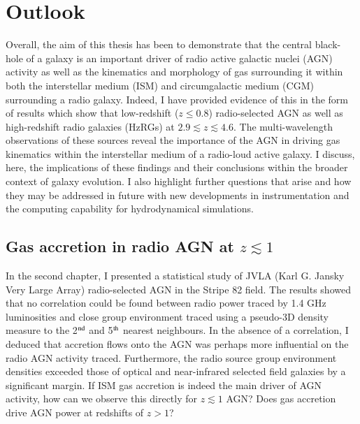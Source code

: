 \chapter[Outlook]{Outlook}

Overall, the aim of this thesis has been to demonstrate that the central black-hole of a galaxy is an important driver of radio active galactic nuclei (AGN) activity as well as the kinematics and morphology of gas surrounding it within both the interstellar medium (ISM) and circumgalactic medium (CGM) surrounding a radio galaxy. Indeed, I have provided evidence of this in the form of results which show that low-redshift ($z \leq 0.8$) radio-selected AGN as well as high-redshift radio galaxies (HzRGs) at $2.9 \lesssim z \lesssim 4.6.$ The multi-wavelength observations of these sources reveal the importance of the AGN in driving gas kinematics within the interstellar medium of a radio-loud active galaxy. I discuss, here, the implications of these findings and their conclusions within the broader context of galaxy evolution. I also highlight further questions that arise and how they may be addressed in future with new developments in instrumentation and the computing capability for hydrodynamical simulations. \\

\section{Gas accretion in radio AGN at $z \lesssim 1$}

In the second chapter, I presented a statistical study of JVLA (Karl G. Jansky Very Large Array) radio-selected AGN in the Stripe 82 field. The results showed that no correlation could be found between radio power traced by 1.4 GHz luminosities and close group environment traced using a pseudo-3D density measure to the 2$^{\rm nd}$ and 5$^{\rm th}$ nearest neighbours. In the absence of a correlation, I deduced that accretion flows onto the AGN was perhaps more influential on the radio AGN activity traced. Furthermore, the radio source group environment densities exceeded those of optical and near-infrared selected field galaxies by a significant margin. If ISM gas accretion is indeed the main driver of AGN activity, how can we observe this directly for $z \lesssim 1$ AGN? Does gas accretion drive AGN power at redshifts of $z > 1$? \\

